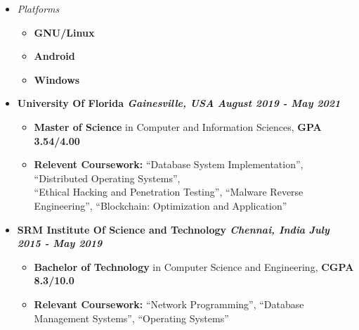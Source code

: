 \documentclass[9]{Resume}
\begin{document}
\begin{minipage}[t]{0.45\textwidth}
\begin{itemize}[noitemsep,nolistsep,leftmargin=*]
    \item[]\textit{Platforms}
            \vspace{-1em}
            \begin{multicols}{2}
            \begin{itemize}[leftmargin=*]
            \setlength\itemsep{-0.25em}
            \item[]\textbf{GNU/Linux}\hspace{5pt}
            \item[]\textbf{Android}\hspace{20pt}
            \item[]\textbf{Windows}\hspace{3pt}
            \end{itemize}
            \end{multicols}
    \end{itemize}
        
\end{minipage}


\begin{itemize}[noitemsep,nolistsep]
    \item[]\textbf{University Of Florida \textit{{\scriptsize Gainesville, USA}} \hfill \textit{August 2019 - May 2021}}
        \begin{itemize}[leftmargin=*]
            \setlength\itemsep{-0.25em}
            \item[\textbullet]{\footnotesize \textbf{Master of Science} in Computer and Information Sciences, \textbf{GPA 3.54/4.00}}
            \item[\textbullet]{\footnotesize \textbf{Relevent Coursework:}
                ``Database System Implementation'', ``Distributed Operating Systems'',\\
                ``Ethical Hacking and Penetration Testing'', ``Malware Reverse Engineering'',
                ``Blockchain: Optimization and Application''}
        \end{itemize}
    \item[]\textbf{SRM Institute Of Science and Technology \textit{{\scriptsize Chennai, India}} \hfill \textit{July 2015 - May 2019}}
        \begin{itemize}[leftmargin=*]
            \setlength\itemsep{-0.25em}
            \item[\textbullet]{\footnotesize \textbf{Bachelor of Technology} in Computer Science and Engineering, \textbf{CGPA 8.3/10.0}}
            \item[\textbullet]{\footnotesize \textbf{Relevant Coursework:}
                                        ``Network Programming'', ``Database Management Systems'', ``Operating Systems''}
        \end{itemize}
\end{itemize}
\end{document}
